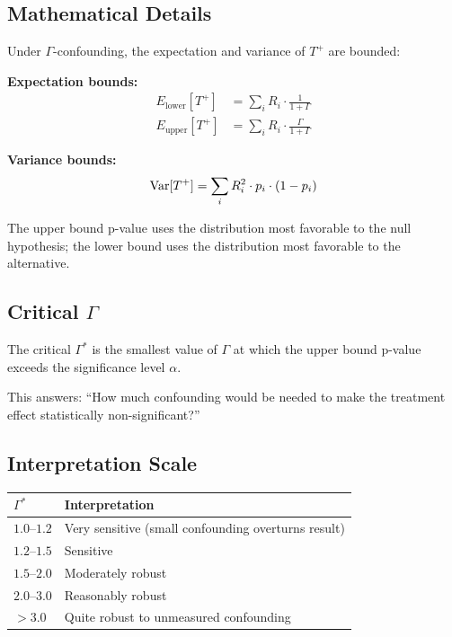 \subsection{Mathematical Details}

Under $\Gamma$-confounding, the expectation and variance of $T^+$ are bounded:

\textbf{Expectation bounds:}
\begin{align}
E_{\text{lower}}[T^+] &= \sum_i R_i \cdot \frac{1}{1+\Gamma} \\
E_{\text{upper}}[T^+] &= \sum_i R_i \cdot \frac{\Gamma}{1+\Gamma}
\end{align}

\textbf{Variance bounds:}
\begin{equation}
\mathrm{Var}[T^+] = \sum_i R_i^2 \cdot p_i \cdot (1 - p_i)
\end{equation}

The upper bound p-value uses the distribution most favorable to the null hypothesis; the lower bound uses the distribution most favorable to the alternative.

\subsection{Critical $\Gamma$}

\begin{definition}
The critical $\Gamma^*$ is the smallest value of $\Gamma$ at which the upper bound p-value exceeds the significance level $\alpha$.
\end{definition}

This answers: ``How much confounding would be needed to make the treatment effect statistically non-significant?''

\subsection{Interpretation Scale}

\begin{center}
\begin{tabular}{lp{8cm}}
\toprule
$\Gamma^*$ & Interpretation \\
\midrule
$1.0$--$1.2$ & Very sensitive (small confounding overturns result) \\
$1.2$--$1.5$ & Sensitive \\
$1.5$--$2.0$ & Moderately robust \\
$2.0$--$3.0$ & Reasonably robust \\
$> 3.0$ & Quite robust to unmeasured confounding \\
\bottomrule
\end{tabular}
\end{center}

